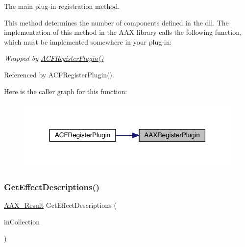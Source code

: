 The main plug-\/in registration method. 

This method determines the number of components defined in the dll. The implementation of this method in the A\+AX library calls the following function, which must be implemented somewhere in your plug-\/in\+:


\begin{DoxyCode}{0}
\end{DoxyCode}


{\itshape Wrapped by \mbox{\hyperlink{a00500_aa455fa4d9a2236334d0fd959b4919788}{A\+C\+F\+Register\+Plugin()}} } 

Referenced by A\+C\+F\+Register\+Plugin().

Here is the caller graph for this function\+:
\nopagebreak
\begin{figure}[H]
\begin{center}
\leavevmode
\includegraphics[width=318pt]{a00796_ga83d05333118598c179ca6d89487fa203_icgraph}
\end{center}
\end{figure}
\mbox{\label{a00796_gae0d356eef326f77cbb972e48946d4892}} 
\subsubsection{\texorpdfstring{GetEffectDescriptions()}{GetEffectDescriptions()}}
{\footnotesize\ttfamily \mbox{\hyperlink{a00392_a4d8f69a697df7f70c3a8e9b8ee130d2f}{A\+A\+X\+\_\+\+Result}} Get\+Effect\+Descriptions (\begin{DoxyParamCaption}\item[{\mbox{\hyperlink{a01777}{A\+A\+X\+\_\+\+I\+Collection}} $\ast$}]{in\+Collection }\end{DoxyParamCaption})}



